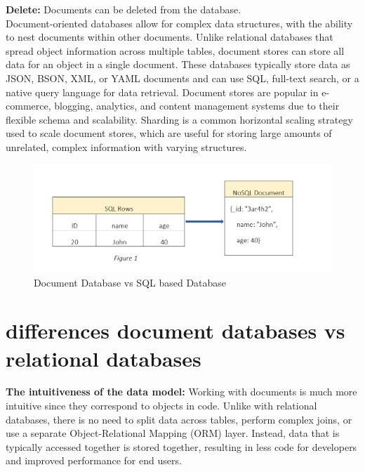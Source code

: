 \textbf{Delete:} Documents can be deleted from the database.\\






Document-oriented databases allow for complex data structures, with the ability to nest documents within other documents. Unlike relational databases that spread object information across multiple tables, document stores can store all data for an object in a single document. These databases typically store data as JSON, BSON, XML, or YAML documents and can use SQL, full-text search, or a native query language for data retrieval. Document stores are popular in e-commerce, blogging, analytics, and content management systems due to their flexible schema and scalability. Sharding is a common horizontal scaling strategy used to scale document stores, which are useful for storing large amounts of unrelated, complex information with varying structures.
\begin{figure}[H]
    \centering
    \includegraphics[width=1.0\textwidth]{images/Document_Database.png}
        \caption{Document Database vs SQL based Database}
    \label{fig:Software pricing Overview}
\end{figure}

\section{differences document databases vs relational databases}
\textbf{The intuitiveness of the data model:} Working with documents is much more intuitive since they correspond to objects in code. Unlike with relational databases, there is no need to split data across tables, perform complex joins, or use a separate Object-Relational Mapping (ORM) layer. Instead, data that is typically accessed together is stored together, resulting in less code for developers and improved performance for end users.


